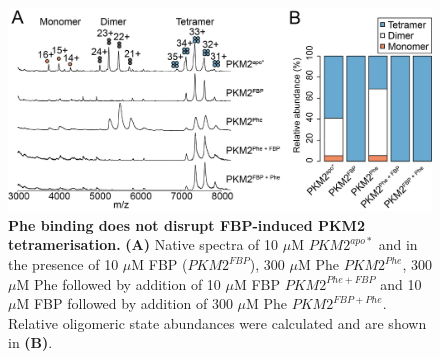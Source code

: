 \begin{figure}[!ht]
\includegraphics[scale=0.7]{ch5_fig9_fbp_phe_enms.png}
\caption[Phe binding does not disrupt FBP-induced PKM2 tetramerisation.] {\textbf{Phe binding does not disrupt FBP-induced PKM2 tetramerisation.} \textbf{(A)} Native spectra of 10 $\mu$M $PKM2^{apo \ast}$ and in the presence of 10 $\mu$M FBP ($PKM2^{FBP}$), 300 $\mu$M Phe $PKM2^{Phe}$, 300 $\mu$M Phe followed by addition of 10 $\mu$M FBP $PKM2^{Phe+FBP}$ and 10 $\mu$M FBP followed by addition of 300 $\mu$M Phe $PKM2^{FBP+Phe}$. Relative oligomeric state abundances were calculated and are shown in \textbf{(B)}. }
\label{fig:phe_fbp_native_spectra}
\end{figure}
%
%
\clearpage



